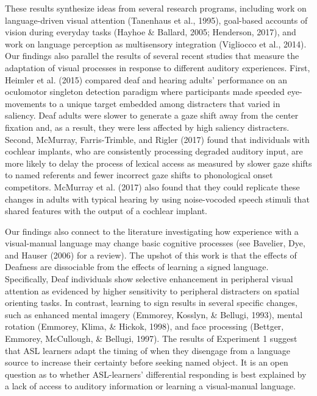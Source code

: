 \documentclass[,man,floatsintext]{apa6}
\begin{document}
These results synthesize ideas from several research programs, including work on language-driven visual attention (Tanenhaus et al., 1995), goal-based accounts of vision during everyday tasks (Hayhoe \& Ballard, 2005; Henderson, 2017), and work on language perception as multisensory integration (Vigliocco et al., 2014). Our findings also parallel the results of several recent studies that measure the adaptation of visual processes in response to different auditory experiences. First, Heimler et al. (2015) compared deaf and hearing adults' performance on an oculomotor singleton detection paradigm where participants made speeded eye-movements to a unique target embedded among distracters that varied in saliency. Deaf adults were slower to generate a gaze shift away from the center fixation and, as a result, they were less affected by high saliency distracters. Second, McMurray, Farris-Trimble, and Rigler (2017) found that individuals with cochlear implants, who are consistently processing degraded auditory input, are more likely to delay the process of lexical access as measured by slower gaze shifts to named referents and fewer incorrect gaze shifts to phonological onset competitors. McMurray et al. (2017) also found that they could replicate these changes in adults with typical hearing by using noise-vocoded speech stimuli that shared features with the output of a cochlear implant.

Our findings also connect to the literature investigating how experience with a visual-manual language may change basic cognitive processes (see Bavelier, Dye, and Hauser (2006) for a review). The upshot of this work is that the effects of Deafness are dissociable from the effects of learning a signed language. Specifically, Deaf individuals show selective enhancement in peripheral visual attention as evidenced by higher sensitivity to peripheral distracters on spatial orienting tasks. In contrast, learning to sign results in several specific changes, such as enhanced mental imagery (Emmorey, Kosslyn, \& Bellugi, 1993), mental rotation (Emmorey, Klima, \& Hickok, 1998), and face processing (Bettger, Emmorey, McCullough, \& Bellugi, 1997). The results of Experiment 1 suggest that ASL learners adapt the timing of when they disengage from a language source to increase their certainty before seeking named object. It is an open question as to whether ASL-learners' differential responding is best explained by a lack of access to auditory information or learning a visual-manual language.
\end{document}
